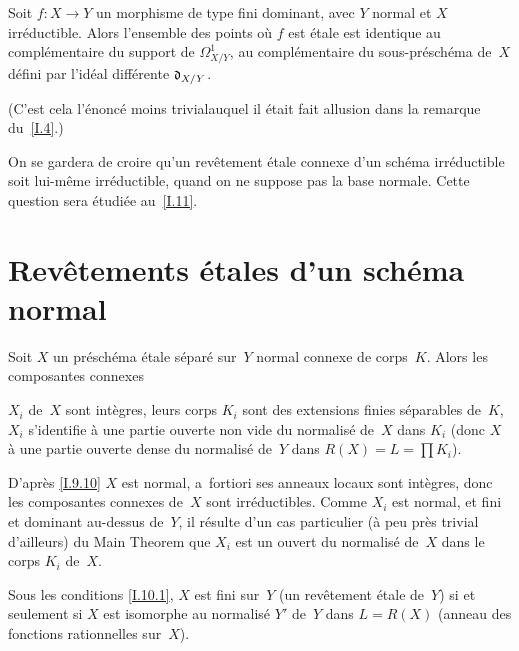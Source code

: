 \begin{corollaire}
\label{I.9.12}
Soit $f\colon X\to Y$ un morphisme de type fini dominant, avec $Y$
normal et $X$ irr\'eductible. Alors l'ensemble des points o\`u
$f$ est \'etale est identique au compl\'ementaire du support de
$\Omega^1_{X/Y}$, \ie au compl\'ementaire du
sous-pr\'esch\'ema de~$X$ d\'efini par l'id\'eal
diff\'erente $\mathfrak{d}_{X/Y}$.
\end{corollaire}

(C'est
cela l'\'enonc\'e \og moins trivial\fg auquel il \'etait fait
allusion dans la remarque du~\No\ref{I.4}.)

\begin{remarquestar}
On se gardera de croire qu'un rev\^etement \'etale connexe d'un
sch\'ema irr\'eductible soit lui-m\^eme irr\'eductible, quand
on ne suppose pas la base normale. Cette question sera
\'etudi\'ee au~\No \ref{I.11}.
\end{remarquestar}

\section{Rev\^etements \'etales d'un sch\'ema normal}
\label{I.10}

\begin{proposition}
\label{I.10.1}
Soit $X$ un pr\'esch\'ema \'etale s\'epar\'e sur~$Y$ normal
connexe de corps~$K$. Alors les composantes connexes

$X_i$ de~$X$ sont int\`egres, leurs corps $K_i$ sont des extensions
finies s\'eparables de~$K$, $X_i$ s'identifie \`a une partie
ouverte non vide du normalis\'e de~$X$ dans $K_i$ (donc $X$ \`a
une partie ouverte dense du normalis\'e de~$Y$ dans $R(X)=L=\prod
K_i$).
\end{proposition}

D'apr\`es \ref{I.9.10} $X$ est normal, a~fortiori ses anneaux locaux sont
int\`egres, donc les composantes connexes de~$X$ sont
irr\'eductibles. Comme $X_i$ est normal, et fini et dominant
au-dessus de~$Y$, il r\'esulte d'un cas particulier (\`a peu
pr\`es trivial d'ailleurs) du Main Theorem que $X_i$ est un ouvert
du normalis\'e de~$X$ dans le corps $K_i$ de~$X$.

\begin{corollaire}
\label{I.10.2}
Sous les conditions \ref{I.10.1}, $X$ est fini sur~$Y$ (\ie un
rev\^etement \'etale de~$Y$) si et seulement si $X$ est isomorphe
au normalis\'e $Y'$ de~$Y$ dans $L=R(X)$ (anneau des fonctions
rationnelles sur~$X$).
\end{corollaire}


